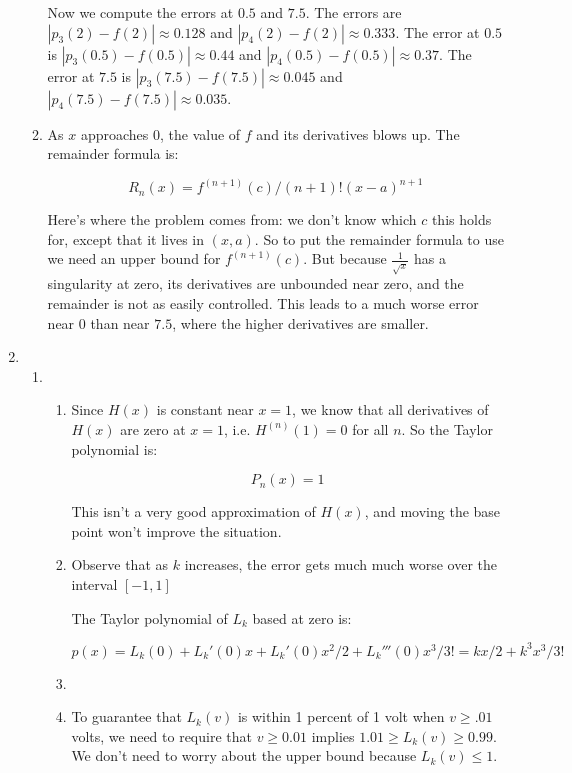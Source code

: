 \begin{enumerate}
\begin{enumerate}
                Now we compute the errors at $0.5$ and $7.5$. The errors are $|p_3(2)-f(2)| \approx 0.128$ and $|p_4(2)-f(2)| \approx 0.333$. The error at $0.5$ is $|p_3(0.5)-f(0.5)| \approx 0.44$ and $|p_4(0.5)-f(0.5)| \approx 0.37$. The error at $7.5$ is $|p_3(7.5)-f(7.5)| \approx 0.045$ and $|p_4(7.5)-f(7.5)| \approx 0.035$. 

		      \item As $x$ approaches $0$, the value of $f$ and its derivatives blows up. The remainder formula is:

		            \[R_n(x) = f^{(n+1)}(c)/(n+1)!(x-a)^{n+1}\]

                Here's where the problem comes from: we don't know which $c$ this holds for, except that it lives in $(x,a)$. So to put the remainder formula to use we need an upper bound for $f^{(n+1)}(c)$. But because $\frac{1}{\sqrt{x}}$ has a singularity at zero, its derivatives are unbounded near zero, and the remainder is not as easily controlled. This leads to a much worse error near $0$ than near $7.5$, where the higher derivatives are smaller. 






	      \end{enumerate}
	\item \begin{enumerate}
		      \item
		            \begin{enumerate}
			            \item Since $H(x)$ is constant near $x=1$, we know that all derivatives of $H(x)$ are zero at $x=1$, i.e. $H^{(n)}(1)=0$ for all $n$. So the Taylor polynomial is:

			                  \[P_n(x) = 1\]

			                  This isn't a very good approximation of $H(x)$, and moving the base point won't improve the situation.


			            \item Observe that as $k$ increases, the error gets much much worse over the interval $[-1,1]$

			                  The Taylor polynomial of $L_k$ based at zero is:

			                  \[p(x) = L_k(0) + L_k'(0)x +L_k'(0)x^2/2 + L_k'''(0)x^3/3! = kx/2 + k^3x^3/3!\]
			            \item

			            \item To guarantee that $L_k(v)$ is within 1 percent of 1 volt when $v \geq .01$ volts, we need to require that $v\geq 0.01 $ implies $1.01 \geq L_k(v)\geq 0.99$. We don't need to worry about the upper bound because $L_k(v) \leq 1$.


\end{enumerate}
\end{enumerate}
\end{enumerate}
